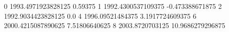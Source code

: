 0 1993.4971923828125 0.59375
1 1992.4300537109375 -0.473388671875
2 1992.9034423828125 0.0
4 1996.09521484375 3.1917724609375
6 2000.4215087890625 7.51806640625
8 2003.8720703125 10.9686279296875
